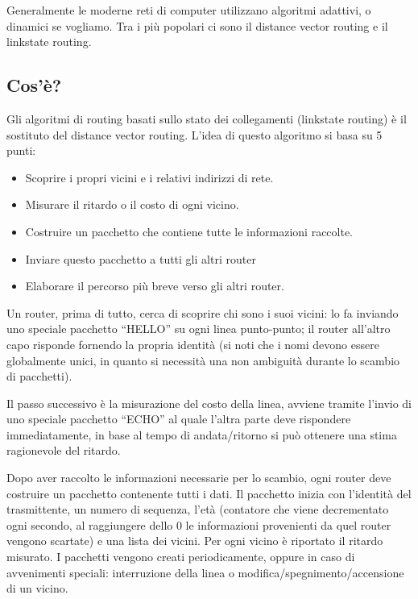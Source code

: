 Generalmente le moderne reti di computer utilizzano algoritmi adattivi, o dinamici se vogliamo. Tra i più popolari ci sono il distance vector routing e il linkstate routing.
\subsection{Cos'è?}
Gli algoritmi di routing basati sullo stato dei collegamenti (linkstate routing) è il sostituto del distance vector routing. L'idea di questo algoritmo si basa su 5 punti:
\begin{itemize}
\item	Scoprire i propri vicini e i relativi indirizzi di rete.
\item	Misurare il ritardo o il costo di ogni vicino.
\item	Costruire un pacchetto che contiene tutte le informazioni raccolte.
\item	Inviare questo pacchetto a tutti gli altri router
\item	Elaborare il percorso più breve verso gli altri router.
\end{itemize}

Un router, prima di tutto, cerca di scoprire chi sono i suoi vicini: lo fa inviando uno speciale pacchetto “HELLO” su ogni linea punto-punto; il router all'altro capo risponde fornendo la propria identità (si noti che i nomi devono essere globalmente unici, in quanto si necessità una non ambiguità durante lo scambio di pacchetti).

Il passo successivo è la misurazione del costo della linea, avviene tramite l'invio di uno speciale pacchetto “ECHO” al quale l'altra parte deve rispondere immediatamente, in base al tempo di andata/ritorno si può ottenere una stima ragionevole del ritardo.

Dopo aver raccolto le informazioni necessarie per lo scambio, ogni router deve costruire un pacchetto contenente tutti i dati. Il pacchetto inizia con l'identità del trasmittente, un numero di sequenza, l'età (contatore che viene decrementato ogni secondo, al raggiungere dello 0 le informazioni provenienti da quel router vengono scartate) e una lista dei vicini. Per ogni vicino è riportato il ritardo misurato. I pacchetti vengono creati periodicamente, oppure in caso di avvenimenti speciali: interruzione della linea o modifica/spegnimento/accensione di un vicino.

